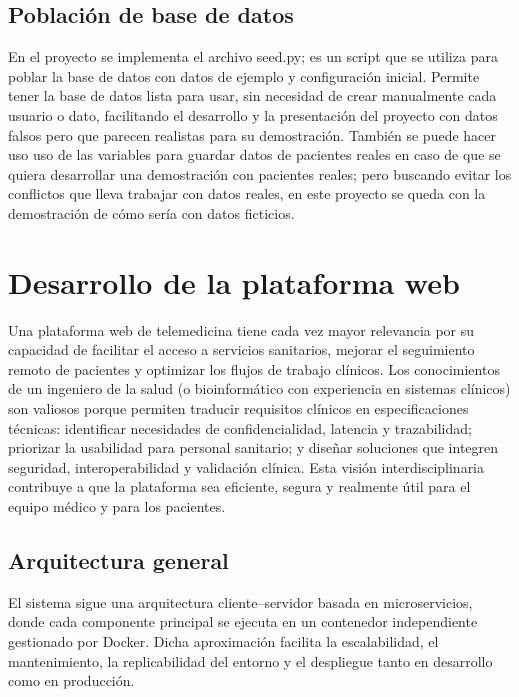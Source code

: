 \documentclass[12pt, a4paper]{article}
\begin{document}
\subsection{Población de base de datos}

En el proyecto se implementa el archivo seed.py; es un script que se utiliza para poblar la base de datos con datos de ejemplo y configuración inicial. Permite tener la base de datos lista para usar, sin necesidad de crear manualmente cada usuario o dato, facilitando el desarrollo y la presentación del proyecto con datos falsos pero que parecen realistas para su demostración. También se puede hacer uso uso de las variables para guardar datos de pacientes reales en caso de que se quiera desarrollar una demostración con pacientes reales; pero buscando evitar los conflictos que lleva trabajar con datos reales, en este proyecto se queda con la demostración de cómo sería con datos ficticios.



\section{Desarrollo de la plataforma web}


Una plataforma web de telemedicina tiene cada vez mayor relevancia por su capacidad de facilitar el acceso a servicios sanitarios, mejorar el seguimiento remoto de pacientes y optimizar los flujos de trabajo clínicos. Los conocimientos de un ingeniero de la salud (o bioinformático con experiencia en sistemas clínicos) son valiosos porque permiten traducir requisitos clínicos en especificaciones técnicas: identificar necesidades de confidencialidad, latencia y trazabilidad; priorizar la usabilidad para personal sanitario; y diseñar soluciones que integren seguridad, interoperabilidad y validación clínica. Esta visión interdisciplinaria contribuye a que la plataforma sea eficiente, segura y realmente útil para el equipo médico y para los pacientes.


\subsection{Arquitectura general}

El sistema sigue una arquitectura cliente--servidor basada en microservicios, donde cada componente principal se ejecuta en un contenedor independiente gestionado por Docker. Dicha aproximación facilita la escalabilidad, el mantenimiento, la replicabilidad del entorno y el despliegue tanto en desarrollo como en producción.
\end{document}
